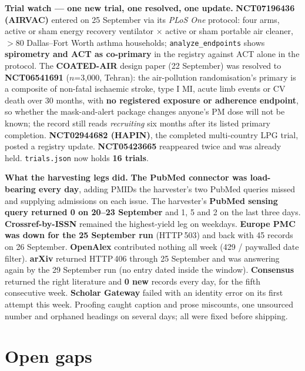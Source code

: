 \documentclass[10pt]{article}
\begin{document}
\vspace{1.5mm}
\textbf{Trial watch --- one new trial, one resolved, one update.} \textbf{NCT07196436 (AIRVAC)}
entered on 25 September via its \textit{PLoS One} protocol: four arms, active or sham energy
recovery ventilator $\times$ active or sham portable air cleaner, $>$80 Dallas--Fort Worth asthma
households; \texttt{analyze\_endpoints} shows \textbf{spirometry and ACT as co-primary} in the
registry against ACT alone in the protocol. The \textbf{COATED-AIR} design paper (22 September) was
resolved to \textbf{NCT06541691} ($n$=3,000, Tehran): the air-pollution randomisation's primary is a
composite of non-fatal ischaemic stroke, type I MI, acute limb events or CV death over 30 months,
with \textbf{no registered exposure or adherence endpoint}, so whether the mask-and-alert package
changes anyone's PM dose will not be known; the record still reads \textit{recruiting} six months
after its listed primary completion. \textbf{NCT02944682 (HAPIN)}, the completed multi-country LPG
trial, posted a registry update. \textbf{NCT05423665} reappeared twice and was already held.
\texttt{trials.json} now holds \textbf{16 trials}.

\vspace{1.5mm}
\textbf{What the harvesting legs did.} \textbf{The PubMed connector was load-bearing every day},
adding PMIDs the harvester's two PubMed queries missed and supplying admissions on each issue. The
harvester's \textbf{PubMed sensing query returned 0 on 20--23 September} and 1, 5 and 2 on the last
three days. \textbf{Crossref-by-ISSN} remained the highest-yield leg on weekdays. \textbf{Europe PMC
was down for the 25 September run} (HTTP\,503) and back with 45 records on 26 September.
\textbf{OpenAlex} contributed nothing all week (429 / paywalled date filter). \textbf{arXiv}
returned HTTP\,406 through 25 September and was answering again by the 29 September run (no entry
dated inside the window). \textbf{Consensus} returned the right literature and \textbf{0 new}
records every day, for the fifth consecutive week. \textbf{Scholar Gateway} failed with an identity
error on its first attempt this week. Proofing caught caption and prose miscounts, one unsourced
number and orphaned headings on several days; all were fixed before shipping.

\vspace{2mm}
\section*{\sffamily\bfseries\color{Deep}Open gaps}
\vspace{-1.5mm}{\color{Teal}\rule{\linewidth}{1.1pt}}\vspace{2.5mm}
\end{document}
